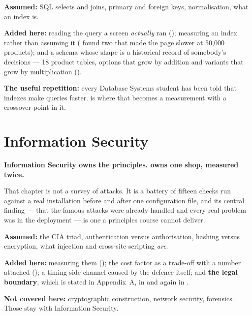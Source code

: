 \begin{tight}
  \item \textbf{Assumed:} SQL selects and joins, primary and foreign keys,
        normalisation, what an index is.
  \item \textbf{Added here:} reading the query a screen \emph{actually} ran
        (); measuring an index rather than assuming it
        ( found two that made the page slower at 50{,}000
        products); and a schema whose shape is a historical record of
        somebody's decisions --- 18 product tables, options that grow by
        addition and variants that grow by multiplication
        ().
  \item \textbf{The useful repetition:} every Database Systems student has been
        told that indexes make queries faster.  is where that
        becomes a measurement with a crossover point in it.
\end{tight}

\section{Information Security}

\begin{conceptbox}
\textbf{Information Security owns the principles.  owns one
shop, measured twice.}

\smallskip
That chapter is not a survey of attacks. It is a battery of fifteen checks run
against a real installation before and after one configuration file, and its
central finding --- that the famous attacks were already handled and every real
problem was in the deployment --- is one a principles course cannot deliver.
\end{conceptbox}

\begin{tight}
  \item \textbf{Assumed:} the CIA triad, authentication versus authorisation,
        hashing versus encryption, what injection and cross-site scripting
        \emph{are}.
  \item \textbf{Added here:} measuring them (); the cost factor
        as a trade-off with a number attached (); a timing side
        channel caused by the defence itself; and \textbf{the legal boundary},
        which is stated in Appendix~A, in  and again in
        .
  \item \textbf{Not covered here:} cryptographic construction, network
        security, forensics. Those stay with Information Security.
\end{tight}


